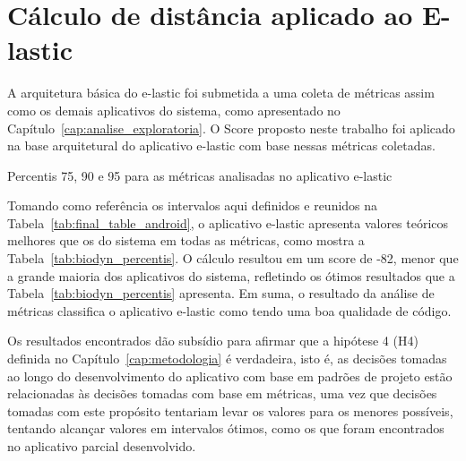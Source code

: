 \section{Cálculo de distância aplicado ao E-lastic}
A arquitetura básica do e-lastic foi submetida a uma coleta de métricas assim como os demais aplicativos do sistema, como apresentado no Capítulo~\ref{cap:analise_exploratoria}. O Score proposto neste trabalho foi aplicado na base arquitetural do aplicativo e-lastic com base nessas métricas coletadas.

\begin{table}[!htb]
\centering
{}

\caption{Percentis 75, 90 e 95 para as métricas analisadas no aplicativo e-lastic}
\label{tab:biodyn_percentis}
\end{table}

Tomando como referência os intervalos aqui definidos e reunidos na Tabela~\ref{tab:final_table_android}, o aplicativo e-lastic apresenta valores teóricos melhores que os do sistema em todas as métricas, como mostra a Tabela~\ref{tab:biodyn_percentis}. O cálculo resultou em um score de -82, menor que a grande maioria dos aplicativos do sistema, refletindo os ótimos resultados que a Tabela~\ref{tab:biodyn_percentis} apresenta. Em suma, o resultado da análise de métricas classifica o aplicativo e-lastic como tendo uma boa qualidade de código.

Os resultados encontrados dão subsídio para afirmar que a hipótese 4 (H4) definida no Capítulo~\ref{cap:metodologia} é verdadeira, isto é, as decisões tomadas ao longo do desenvolvimento do aplicativo com base em padrões de projeto estão relacionadas às decisões tomadas com base em métricas, uma vez que decisões tomadas com este propósito tentariam levar os valores para os menores possíveis, tentando alcançar valores em intervalos ótimos, como os que foram encontrados no aplicativo parcial desenvolvido.

